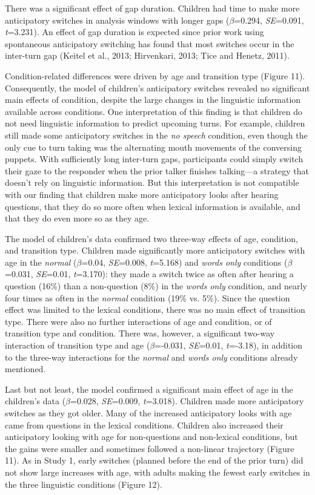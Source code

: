 \documentclass[authoryear, 12pt]{elsarticle}
\begin{document}
There was a significant effect of gap duration. Children had time to make more anticipatory switches in analysis windows with longer gaps (\textit{$\beta$}=0.294, \textit{SE}=0.091, \textit{t}=3.231). An effect of gap duration is expected since prior work using spontaneous anticipatory switching has found that most switches occur in the inter-turn gap (Keitel et al., 2013; Hirvenkari, 2013; Tice and Henetz, 2011).

Condition-related differences were driven by age and transition type (Figure 11). Consequently, the model of children's anticipatory switches revealed no significant main effects of condition, despite the large changes in the linguistic information available across conditions. One interpretation of this finding is that children do not need linguistic information to predict upcoming turns. For example, children still made some anticipatory switches in the \textit{no speech} condition, even though the only cue to turn taking was the alternating mouth movements of the conversing puppets. With sufficiently long inter-turn gaps, participants could simply switch their gaze to the responder when the prior talker finishes talking---a strategy that doesn't rely on linguistic information. But this interpretation is not compatible with our finding that children make more anticipatory looks after hearing questions, that they do so more often when lexical information is available, and that they do even more so as they age.

The model of children's data confirmed two three-way effects of age, condition, and transition type. Children made significantly more anticipatory switches with age in the \textit{normal} (\textit{$\beta$}=0.04, \textit{SE}=0.008, \textit{t}=5.168) and \textit{words only} conditions (\textit{$\beta$}=0.031, \textit{SE}=0.01, \textit{t}=3.170): they made a switch twice as often after hearing a question (16\%) than a non-question (8\%) in the \textit{words only} condition, and nearly four times as often in the \textit{normal} condition (19\% vs. 5\%). Since the question effect was limited to the lexical conditions, there was no main effect of transition type. There were also no further interactions of age and condition, or of transition type and condition. There was, however, a significant two-way interaction of transition type and age (\textit{$\beta$}=-0.031, \textit{SE}=0.01, \textit{t}=-3.18), in addition to the three-way interactions for the \textit{normal} and \textit{words only} conditions already mentioned.

Last but not least, the model confirmed a significant main effect of age in the children's data (\textit{$\beta$}=0.028, \textit{SE}=0.009, \textit{t}=3.018). Children made more anticipatory switches as they got older. Many of the increased anticipatory looks with age came from questions in the lexical conditions. Children also increased their anticipatory looking with age for non-questions and non-lexical conditions, but the gains were smaller and sometimes followed a non-linear trajectory (Figure 11). As in Study 1, early switches (planned before the end of the prior turn) did not show large increases with age, with adults making the fewest early switches in the three linguistic conditions (Figure 12).
\end{document}
